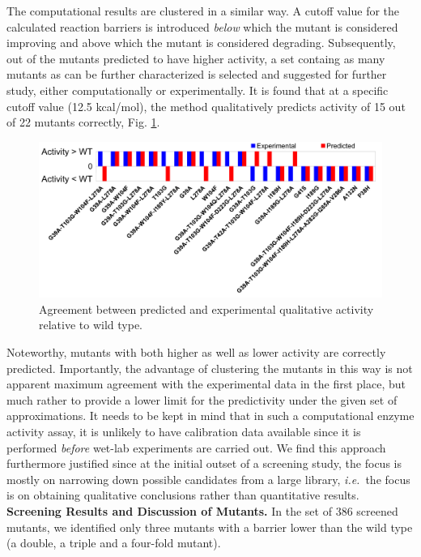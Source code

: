 The computational results are clustered in a similar way.
A cutoff value for the calculated reaction barriers is introduced \textit{below} which the mutant is considered improving and above which the mutant is considered degrading.
Subsequently, out of the mutants predicted to have higher activity, a set containg as many mutants as can be further characterized is selected and suggested for further study, either computationally or experimentally.
It is found that at a specific cutoff value (12.5 kcal/mol), the method qualitatively predicts activity of 15 out of 22 mutants correctly, Fig. \ref{fig:diag-predictivity}.
\begin{figure}[htbp] 
\includegraphics[width=1.00\linewidth]{diag-predictivity-truncated.pdf}
\caption{
Agreement between predicted and experimental qualitative activity relative to wild type\cite{hediger2013silico}.
}
\label{fig:diag-predictivity}
\end{figure}
Noteworthy, mutants with both higher as well as lower activity are correctly predicted.
Importantly, the advantage of clustering the mutants in this way is not apparent maximum agreement with the experimental data in the first place, but much rather to provide a lower limit for the predictivity under the given set of approximations.
It needs to be kept in mind that in such a computational enzyme activity assay, it is unlikely to have calibration data available since it is performed \textit{before} wet-lab experiments are carried out.
We find this approach furthermore justified since at the initial outset of a screening study, the focus is mostly on narrowing down possible candidates from a large library, \textit{i.e.} the focus is on obtaining qualitative conclusions rather than quantitative results\cite{agresti2010ultrahigh}.\\
\textbf{Screening Results and Discussion of Mutants.}
In the set of 386 screened mutants, we identified only three mutants with a barrier lower than the wild type (a double, a triple and a four-fold mutant).
